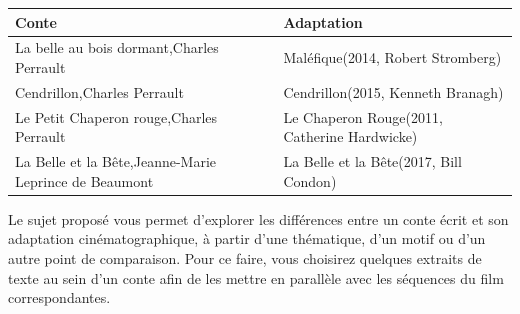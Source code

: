 \documentclass[
  10pt,
  french,
  a5paper,
  openany]{book}
\begin{document}
\begin{longtable}[]{@{}ll@{}}
\toprule
\begin{minipage}[b]{0.51\columnwidth}\raggedright
Conte\strut
\end{minipage} & \begin{minipage}[b]{0.43\columnwidth}\raggedright
Adaptation\strut
\end{minipage}\tabularnewline
\midrule
\endhead
\begin{minipage}[t]{0.51\columnwidth}\raggedright
La belle au bois dormant,\linebreak Charles Perrault\strut
\end{minipage} & \begin{minipage}[t]{0.43\columnwidth}\raggedright
Maléfique\linebreak (2014, Robert Stromberg)\strut
\end{minipage}\tabularnewline
\begin{minipage}[t]{0.51\columnwidth}\raggedright
Cendrillon,\linebreak Charles Perrault\strut
\end{minipage} & \begin{minipage}[t]{0.43\columnwidth}\raggedright
Cendrillon\linebreak (2015, Kenneth Branagh)\strut
\end{minipage}\tabularnewline
\begin{minipage}[t]{0.51\columnwidth}\raggedright
Le Petit Chaperon rouge,\linebreak Charles Perrault\strut
\end{minipage} & \begin{minipage}[t]{0.43\columnwidth}\raggedright
Le Chaperon Rouge\linebreak (2011, Catherine Hardwicke)\strut
\end{minipage}\tabularnewline
\begin{minipage}[t]{0.51\columnwidth}\raggedright
La Belle et la Bête,\linebreak Jeanne-Marie Leprince de Beaumont\strut
\end{minipage} & \begin{minipage}[t]{0.43\columnwidth}\raggedright
La Belle et la Bête\linebreak (2017, Bill Condon)\strut
\end{minipage}\tabularnewline
\bottomrule
\end{longtable}

\clearpage

Le sujet proposé vous permet d'explorer les différences entre un conte écrit et son adaptation cinématographique, à partir d'une thématique, d'un motif ou d'un autre point de comparaison. Pour ce faire, vous choisirez quelques extraits de texte au sein d'un conte afin de les mettre en parallèle avec les séquences du film correspondantes.
\end{document}
